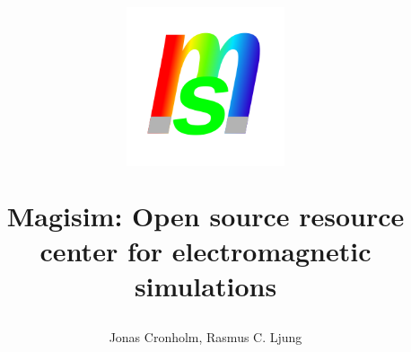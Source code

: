 \documentclass[11pt, a4paper, titlepage]{article}
\begin{document}
	\begin{titlepage}
		\title{\includegraphics[width=0.35\textwidth]{magisim_logo256.png}\par\vspace{1cm}Magisim: Open source resource center for electromagnetic simulations \let\thefootnote\relax{}}
		\author{Jonas Cronholm, Rasmus C. Ljung}
		\maketitle
	\end{titlepage}
\end{document}

